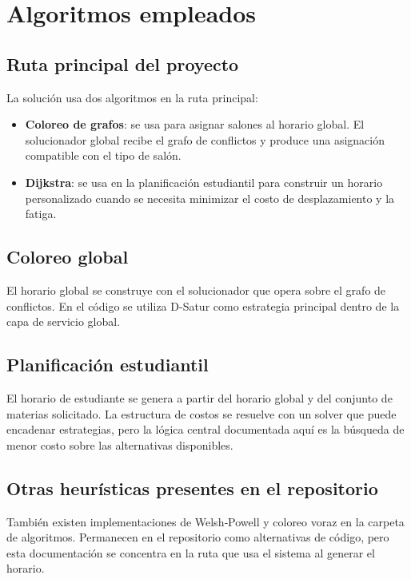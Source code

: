\chapter{Algoritmos empleados}

\section{Ruta principal del proyecto}

La solución usa dos algoritmos en la ruta principal:

\begin{itemize}[leftmargin=1.5cm]
  \item \textbf{Coloreo de grafos}: se usa para asignar salones al horario global. El solucionador global recibe el grafo de conflictos y produce una asignación compatible con el tipo de salón.
  \item \textbf{Dijkstra}: se usa en la planificación estudiantil para construir un horario personalizado cuando se necesita minimizar el costo de desplazamiento y la fatiga.
\end{itemize}

\section{Coloreo global}

El horario global se construye con el solucionador que opera sobre el grafo de conflictos. En el código se utiliza D-Satur como estrategia principal dentro de la capa de servicio global.

\section{Planificación estudiantil}

El horario de estudiante se genera a partir del horario global y del conjunto de materias solicitado. La estructura de costos se resuelve con un solver que puede encadenar estrategias, pero la lógica central documentada aquí es la búsqueda de menor costo sobre las alternativas disponibles.

\section{Otras heurísticas presentes en el repositorio}

También existen implementaciones de Welsh‑Powell y coloreo voraz en la carpeta de algoritmos. Permanecen en el repositorio como alternativas de código, pero esta documentación se concentra en la ruta que usa el sistema al generar el horario.
